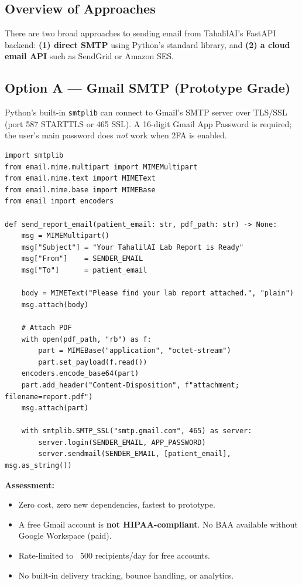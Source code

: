 \documentclass[12pt,a4paper]{article}
\newcommand{\codeinline}[1]{\texttt{\small\color{accent}#1}}
\newcommand{\pro}{\textcolor{green}{\textbf{+}}}
\newcommand{\con}{\textcolor{red}{\textbf{--}}}
\begin{document}
\subsection{Overview of Approaches}

There are two broad approaches to sending email from TahalilAI's FastAPI
backend: \textbf{(1) direct SMTP} using Python's standard library, and
\textbf{(2) a cloud email API} such as SendGrid or Amazon SES.

\subsection{Option A --- Gmail SMTP (Prototype Grade)}

Python's built-in \codeinline{smtplib} can connect to Gmail's SMTP server
over TLS/SSL (port 587 STARTTLS or 465 SSL). A 16-digit Gmail App Password
is required; the user's main password does \emph{not} work when 2FA is
enabled.

\begin{lstlisting}[style=python, caption={Minimal Gmail SMTP example (Python)}]
import smtplib
from email.mime.multipart import MIMEMultipart
from email.mime.text import MIMEText
from email.mime.base import MIMEBase
from email import encoders

def send_report_email(patient_email: str, pdf_path: str) -> None:
    msg = MIMEMultipart()
    msg["Subject"] = "Your TahalilAI Lab Report is Ready"
    msg["From"]    = SENDER_EMAIL
    msg["To"]      = patient_email

    body = MIMEText("Please find your lab report attached.", "plain")
    msg.attach(body)

    # Attach PDF
    with open(pdf_path, "rb") as f:
        part = MIMEBase("application", "octet-stream")
        part.set_payload(f.read())
    encoders.encode_base64(part)
    part.add_header("Content-Disposition", f"attachment; filename=report.pdf")
    msg.attach(part)

    with smtplib.SMTP_SSL("smtp.gmail.com", 465) as server:
        server.login(SENDER_EMAIL, APP_PASSWORD)
        server.sendmail(SENDER_EMAIL, [patient_email], msg.as_string())
\end{lstlisting}

\noindent\textbf{Assessment:}
\begin{itemize}[leftmargin=2em, itemsep=2pt]
    \item[\pro] Zero cost, zero new dependencies, fastest to prototype.
    \item[\con] A free Gmail account is \textbf{not HIPAA-compliant}. No BAA
          available without Google Workspace (paid).
    \item[\con] Rate-limited to ~500 recipients/day for free accounts.
    \item[\con] No built-in delivery tracking, bounce handling, or analytics.
\end{itemize}
\end{document}
